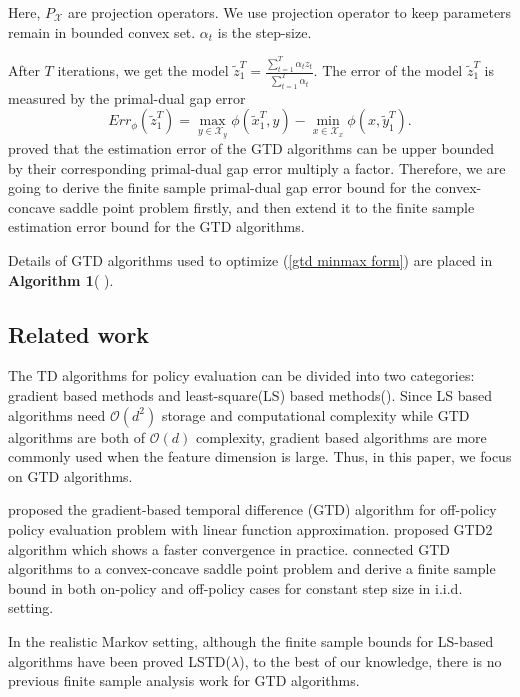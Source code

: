\documentclass[twoside,11pt]{article}
\numberwithin{equation}{section}
\begin{document}
		Here, $ P_{\mathcal{X}} $ are   projection operators. We use projection operator to keep parameters remain in bounded convex set. $ \alpha_t $ is  the step-size.
			
		After $T$ iterations, we get the model 
		$ 	\tilde{z}_1^T = \frac{\sum_{t=1}^{T}\alpha_tz_t }{\sum_{t=1}^{T}\alpha_t } $.	
		The error of the model $ \tilde{z}_1^T $ is measured by the primal-dual gap error 
		 \begin{equation}\label{error function}
		Err_\phi(\tilde{z}_1^T) = \max_{y\in \mathcal{X}_y}\phi( \tilde{x}_1^T,y ) - \min_{x\in\mathcal{X}_x}\phi(x,\tilde{y}_1^T).
		\end{equation}  	
		\cite{liu2015finite} proved that the estimation error of the GTD algorithms can be upper bounded by their corresponding primal-dual gap error multiply a factor. Therefore, we are going to derive the finite sample primal-dual gap error bound for the  convex-concave saddle point problem firstly, and then extend it to the finite sample estimation error bound for the GTD algorithms.
		
		Details of  GTD algorithms used to optimize (\ref{gtd minmax form}) are placed in \textbf{Algorithm 1}( \cite{liu2015finite}).
	\subsection{Related work}
		The TD algorithms for policy evaluation can be divided into two categories: gradient based methods and least-square(LS) based methods(\cite{dann2014policy}). Since LS based algorithms need $ \mathcal{O}(d^2) $ storage and computational complexity while GTD algorithms are both of $ \mathcal{O}(d) $ complexity, gradient based algorithms are more commonly used when the feature dimension is large. Thus, in this paper, we focus on GTD algorithms.
		
		\cite{sutton2009convergent}  proposed the gradient-based temporal difference (GTD) algorithm for off-policy policy  evaluation problem with linear function approximation.  \cite{sutton2009fast} proposed GTD2 algorithm which shows a faster convergence in practice. \cite{liu2015finite}  connected GTD algorithms to a convex-concave saddle point problem and derive a finite sample bound in both on-policy and off-policy cases for constant step size in i.i.d.  setting. 
		
		In the realistic Markov setting, although the finite sample bounds for LS-based algorithms have been proved \cite{lazaric2012finite} \cite{tagorti2015rate} LSTD($ \lambda $), to the best of our knowledge, there is no previous  finite sample analysis work for GTD algorithms. 
		
\end{document}
